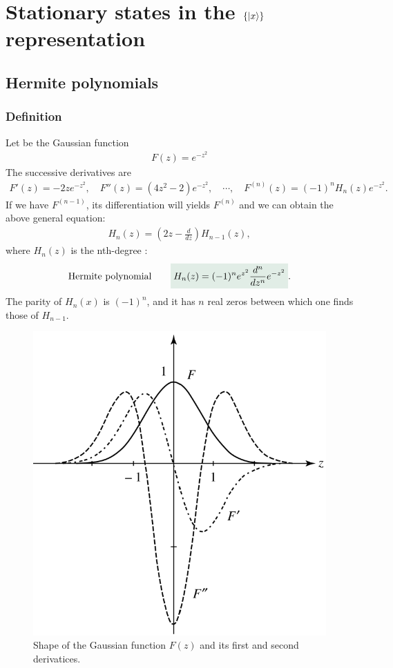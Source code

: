 \section{Stationary states in the $\{|x\rangle\}$ representation}
\subsection{Hermite polynomials}

\subsubsection{Definition}
Let be the Gaussian function 
\begin{align}
    F(z)=e^{-z^2}
\end{align}
The successive derivatives are 
\begin{align*}
    F'(z)=-2ze^{-z^2},\quad F''(z)=(4z^2-2)e^{-z^2},\quad\cdots,\quad F^{(n)}(z)=(-1)^nH_n(z)e^{-z^2}.
\end{align*}
If we have $F^{(n-1)}$, its differentiation will yields $F^{(n)}$ and we can obtain the above general equation:
\begin{align}
    H_n(z)=\left(2z-\frac{d}{dz}\right)H_{n-1}(z),
    \label{eq:relhermite}
\end{align}
where $H_n(z)$ is the nth-degree :
\begin{align}
    \text{Hermite polynomial}\qquad\highlight{H_n(z)=(-1)^ne^{z^2}\frac{d^n}{dz^n}e^{-z^2}}.
    \label{eq:hermitepolynomial}
\end{align}
The parity of $H_n(x)$ is $(-1)^n$, and it has $n$ real zeros between which one finds those of $H_{n-1}$.
\begin{figure}[h!]
    \centering
    \includegraphics[width=.4\columnwidth]{PartOne/ChapterThree/gaussianandf.png}
    \caption{Shape of the Gaussian function $F(z)$ and its first and second derivatices.}
\end{figure}
